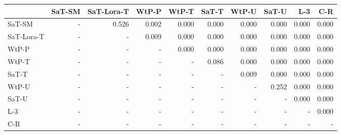 \begin{tabular}{lrrrrrrrrr}
\toprule
 & SaT-SM & SaT-Lora-T & WtP-P & WtP-T & SaT-T & WtP-U & SaT-U & L-3 & C-R \\
\midrule
SaT-SM & - & 0.526 & 0.002 & 0.000 & 0.000 & 0.000 & 0.000 & 0.000 & 0.000 \\
SaT-Lora-T & - & - & 0.009 & 0.000 & 0.000 & 0.000 & 0.000 & 0.000 & 0.000 \\
WtP-P & - & - & - & 0.000 & 0.000 & 0.000 & 0.000 & 0.000 & 0.000 \\
WtP-T & - & - & - & - & 0.086 & 0.000 & 0.000 & 0.000 & 0.000 \\
SaT-T & - & - & - & - & - & 0.009 & 0.000 & 0.000 & 0.000 \\
WtP-U & - & - & - & - & - & - & 0.252 & 0.000 & 0.000 \\
SaT-U & - & - & - & - & - & - & - & 0.000 & 0.000 \\
L-3 & - & - & - & - & - & - & - & - & 0.000 \\
C-R & - & - & - & - & - & - & - & - & - \\
\bottomrule
\end{tabular}

